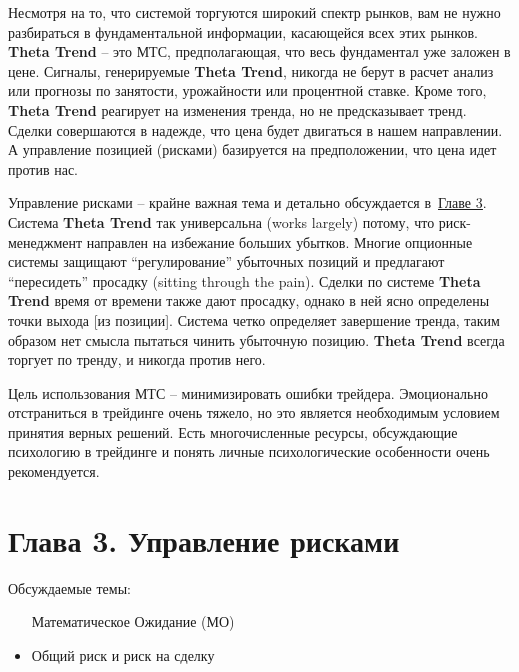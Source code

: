 \documentclass[12pt,DIV=18]{scrartcl}
\begin{document}
\bigskip

Несмотря на то, что системой торгуются широкий спектр рынков, вам не нужно разбираться в фундаментальной информации, касающейся всех этих рынков. \textbf{Theta Trend} -- это МТС, предполагающая, что весь фундаментал уже заложен в цене. Сигналы, генерируемые \textbf{Theta Trend}, никогда не берут в расчет анализ или прогнозы по занятости, урожайности или процентной ставке. Кроме того, \textbf{Theta Trend} реагирует на изменения тренда, но не предсказывает тренд. Сделки совершаются в надежде, что цена будет двигаться в нашем направлении. А управление позицией (рисками) базируется на предположении, что цена идет против нас.

\bigskip

Управление рисками -- крайне важная тема и детально обсуждается в~\hyperref[chapter3]{\ul{Главе 3}}. Система \textbf{Theta Trend} так универсальна (works  largely) потому, что риск-менеджмент направлен на избежание больших убытков. Многие опционные системы защищают ``регулирование'' убыточных позиций и предлагают ``пересидеть'' просадку (sitting through the pain). Сделки по системе \textbf{Theta Trend} время от времени также дают просадку, однако в ней ясно определены точки выхода [из позиции]. Система четко определяет завершение тренда, таким образом нет смысла пытаться чинить убыточную позицию. \textbf{Theta Trend} всегда торгует по тренду, и никогда против него.

\bigskip

Цель использования МТС -- минимизировать ошибки трейдера. Эмоционально отстраниться в трейдинге очень тяжело, но это является необходимым условием принятия верных решений. Есть многочисленные ресурсы, обсуждающие психологию в трейдинге и понять личные психологические особенности очень рекомендуется.

\section*{Глава 3. Управление рисками}
\label{chapter3}
\bigskip

Обсуждаемые темы:

\begin{itemize}
\item [Математическое] Ожидание (МО)
\item Общий риск и риск на сделку
\end{itemize}

\bigskip
\end{document}
